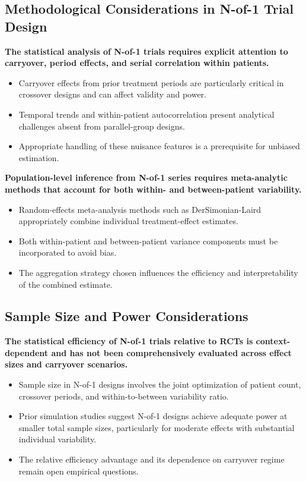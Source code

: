 \documentclass[
  11pt,
]{article}
\begin{document}
\subsection{Methodological Considerations in N-of-1 Trial Design}\label{methodological-considerations-in-n-of-1-trial-design}

\textbf{The statistical analysis of N-of-1 trials requires explicit attention to carryover, period effects, and serial correlation within patients.}

\begin{itemize}\setlength{\itemsep}{2pt}\setlength{\parskip}{0pt}
\item Carryover effects from prior treatment periods are particularly critical in crossover designs and can affect validity and power.
\item Temporal trends and within-patient autocorrelation present analytical challenges absent from parallel-group designs.
\item Appropriate handling of these nuisance features is a prerequisite for unbiased estimation.
\end{itemize}

\textbf{Population-level inference from N-of-1 series requires meta-analytic methods that account for both within- and between-patient variability.}

\begin{itemize}\setlength{\itemsep}{2pt}\setlength{\parskip}{0pt}
\item Random-effects meta-analysis methods such as DerSimonian-Laird appropriately combine individual treatment-effect estimates.
\item Both within-patient and between-patient variance components must be incorporated to avoid bias.
\item The aggregation strategy chosen influences the efficiency and interpretability of the combined estimate.
\end{itemize}

\subsection{Sample Size and Power Considerations}\label{sample-size-and-power-considerations}

\textbf{The statistical efficiency of N-of-1 trials relative to RCTs is context-dependent and has not been comprehensively evaluated across effect sizes and carryover scenarios.}

\begin{itemize}\setlength{\itemsep}{2pt}\setlength{\parskip}{0pt}
\item Sample size in N-of-1 designs involves the joint optimization of patient count, crossover periods, and within-to-between variability ratio.
\item Prior simulation studies suggest N-of-1 designs achieve adequate power at smaller total sample sizes, particularly for moderate effects with substantial individual variability.
\item The relative efficiency advantage and its dependence on carryover regime remain open empirical questions.
\end{itemize}
\end{document}
